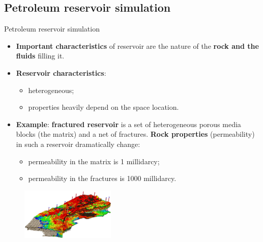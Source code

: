 \subsection{Petroleum reservoir simulation}
%
\begin{frame}{Petroleum reservoir simulation}
	
	
	
	
		\begin{itemize}
		\item {\bf Important characteristics} of reservoir are the nature of the \alert{\bf rock and the fluids} filling it.
		\pause
		\item \alert{\bf Reservoir characteristics}:
		\begin{itemize}
			\item heterogeneous;
			\item properties heavily depend
			on the space location.
		\end{itemize}
		\pause
		\item {\bf Example}: \alert{\bf fractured reservoir} is a set of heterogeneous porous media blocks (the matrix) and a net of fractures. {\bf Rock properties} (permeability) in such a reservoir dramatically change: 
		\begin{itemize}
			\item permeability in the matrix is 1 millidarcy;
			\item permeability in the fractures is 1000 millidarcy.
		\end{itemize}

	\end{itemize}
		
%		
		\begin{figure}
			\centering
			\includegraphics[width=0.4\textwidth]{figures/reactive-transport/reservoir-simulation.png}
		\end{figure}

\end{frame}
%
